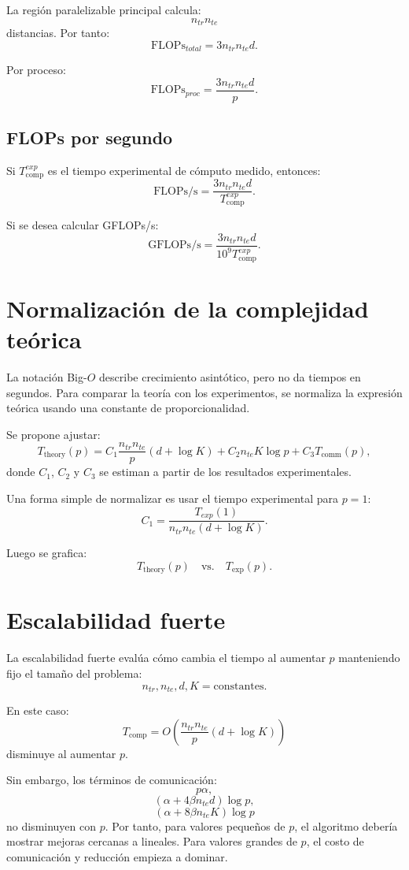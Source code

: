 \documentclass[11pt,a4paper]{article}
\begin{document}
La región paralelizable principal calcula:
\[
n_{tr}n_{te}
\]
distancias. Por tanto:
\[
\boxed{
\mathrm{FLOPs}_{total}
=
3n_{tr}n_{te}d
}.
\]

Por proceso:
\[
\boxed{
\mathrm{FLOPs}_{proc}
=
\frac{3n_{tr}n_{te}d}{p}
}.
\]

\subsection{FLOPs por segundo}

Si $T_{\text{comp}}^{exp}$ es el tiempo experimental de cómputo medido, entonces:
\[
\boxed{
\mathrm{FLOPs/s}
=
\frac{3n_{tr}n_{te}d}{T_{\text{comp}}^{exp}}
}.
\]

Si se desea calcular GFLOPs/s:
\[
\boxed{
\mathrm{GFLOPs/s}
=
\frac{3n_{tr}n_{te}d}{10^9T_{\text{comp}}^{exp}}
}.
\]

\section{Normalización de la complejidad teórica}

La notación Big-$O$ describe crecimiento asintótico, pero no da tiempos en segundos. Para comparar
la teoría con los experimentos, se normaliza la expresión teórica usando una constante de
proporcionalidad.

Se propone ajustar:
\[
T_{\text{theory}}(p)
=
C_1
\frac{n_{tr}n_{te}}{p}(d+\log K)
+
C_2 n_{te}K\log p
+
C_3 T_{\text{comm}}(p),
\]
donde $C_1$, $C_2$ y $C_3$ se estiman a partir de los resultados experimentales.

Una forma simple de normalizar es usar el tiempo experimental para $p=1$:
\[
C_1
=
\frac{T_{exp}(1)}{n_{tr}n_{te}(d+\log K)}.
\]

Luego se grafica:
\[
T_{\text{theory}}(p)
\quad \text{vs.} \quad
T_{\text{exp}}(p).
\]

\section{Escalabilidad fuerte}

La escalabilidad fuerte evalúa cómo cambia el tiempo al aumentar $p$ manteniendo fijo el tamaño
del problema:
\[
n_{tr}, n_{te}, d, K = \text{constantes}.
\]

En este caso:
\[
T_{\text{comp}} =
O\left(
\frac{n_{tr}n_{te}}{p}(d+\log K)
\right)
\]
disminuye al aumentar $p$.

Sin embargo, los términos de comunicación:
\[
p\alpha,
\]
\[
(\alpha + 4\beta n_{te}d)\log p,
\]
\[
(\alpha + 8\beta n_{te}K)\log p
\]
no disminuyen con $p$. Por tanto, para valores pequeños de $p$, el algoritmo debería mostrar
mejoras cercanas a lineales. Para valores grandes de $p$, el costo de comunicación y reducción
empieza a dominar.
\end{document}
